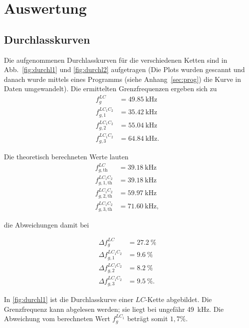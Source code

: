 \section{Auswertung}
\label{sec:Auswertung}

\subsection{Durchlasskurven}
Die aufgenommenen Durchlasskurven für die verschiedenen Ketten sind in Abb.~\ref{fig:durchl1} und \ref{fig:durchl2} aufgetragen (Die Plots wurden gescannt und danach wurde mittels eines Programms (siehe Anhang~\ref{sec:prog}) die Kurve in Daten umgewandelt). Die ermittelten Grenzfrequenzen ergeben sich zu
\begin{align}
  f_g^{LC} &= \SI{49,85}{\kilo\hertz} \\
  f_{g,1}^{LC_1C_2} &= \SI{35,42}{\kilo\hertz} \\
  f_{g,2}^{LC_1C_2} &= \SI{55,04}{\kilo\hertz} \\
  f_{g,3}^{LC_1C_2} &= \SI{64,84}{\kilo\hertz}.
\end{align}

Die theoretisch berechneten Werte lauten
\begin{align}
  f_{g,\text{th}}^{LC} &= \SI{39,18}{\kilo\hertz} \\
  f_{g,1,\text{th}}^{LC_1C_2} &= \SI{39,18}{\kilo\hertz} \\
  f_{g,2,\text{th}}^{LC_1C_2} &= \SI{59,97}{\kilo\hertz} \\
  f_{g,3,\text{th}}^{LC_1C_2} &= \SI{71,60}{\kilo\hertz},
\end{align}

die Abweichungen damit bei

\begin{align}
  \Delta f_g^{LC} &= \SI{27,2}{\%} \\
  \Delta f_{g,1}^{LC_1C_2} &= \SI{9,6}{\%} \\
  \Delta f_{g,2}^{LC_1C_2} &= \SI{8,2}{\%} \\
  \Delta f_{g,3}^{LC_1C_2} &= \SI{9,5}{\%}.
\end{align}


In \ref{fig:durchl1} ist die Durchlasskurve einer $LC$-Kette abgebildet. Die Grenzfrequenz kann abgelesen werden; sie liegt bei ungefähr \SI{49}{\kilo\hertz}. Die Abweichung vom berechneten Wert $f_g^{LC_{1}}$ beträgt somit $1,7\%$.

